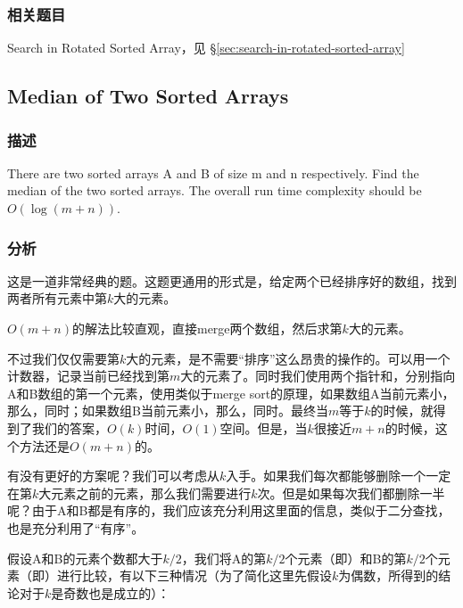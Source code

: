 \subsubsection{相关题目}

\begindot
\item Search in Rotated Sorted Array，见 \S \ref{sec:search-in-rotated-sorted-array}
\myenddot


\subsection{Median of Two Sorted Arrays}
\label{sec:median-of-two-sorted-arrays}


\subsubsection{描述}
There are two sorted arrays A and B of size m and n respectively. Find the median of the two sorted arrays. The overall run time complexity should be $O(\log (m+n))$.


\subsubsection{分析}
这是一道非常经典的题。这题更通用的形式是，给定两个已经排序好的数组，找到两者所有元素中第$k$大的元素。

$O(m+n)$的解法比较直观，直接merge两个数组，然后求第$k$大的元素。

不过我们仅仅需要第$k$大的元素，是不需要“排序”这么昂贵的操作的。可以用一个计数器，记录当前已经找到第$m$大的元素了。同时我们使用两个指针和，分别指向A和B数组的第一个元素，使用类似于merge sort的原理，如果数组A当前元素小，那么，同时；如果数组B当前元素小，那么，同时。最终当$m$等于$k$的时候，就得到了我们的答案，$O(k)$时间，$O(1)$空间。但是，当$k$很接近$m+n$的时候，这个方法还是$O(m+n)$的。

有没有更好的方案呢？我们可以考虑从$k$入手。如果我们每次都能够删除一个一定在第$k$大元素之前的元素，那么我们需要进行$k$次。但是如果每次我们都删除一半呢？由于A和B都是有序的，我们应该充分利用这里面的信息，类似于二分查找，也是充分利用了“有序”。

假设A和B的元素个数都大于$k/2$，我们将A的第$k/2$个元素（即）和B的第$k/2$个元素（即）进行比较，有以下三种情况（为了简化这里先假设$k$为偶数，所得到的结论对于$k$是奇数也是成立的）：
\begindot
\item {}
\item {}
\item {}
\myenddot

